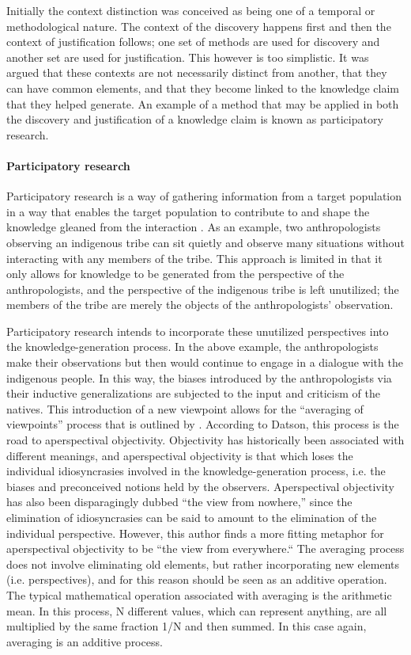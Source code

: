 \documentclass[a4paper]{article}
\begin{document}
Initially the context distinction was conceived as being one of a temporal or
methodological nature. The context of the discovery happens first and then the
context of justification follows; one set of methods are used for discovery
and another set are used for justification. This however is too simplistic.
It was argued that these contexts are not necessarily distinct from another,
that they can have common elements, and that they become linked to the
knowledge claim that they helped generate. An example of a method that may be
applied in both the discovery and justification of a knowledge claim is known
as participatory research.

\paragraph{Participatory research}
\label{part}

Participatory research is a way of gathering information from a target
population in a way that enables the target population to contribute to and
shape the knowledge gleaned from the interaction
\cite{bergold2012participatory}. As an example, two anthropologists observing
an indigenous tribe can sit quietly and observe many situations without
interacting with any members of the tribe. This approach is limited in that it
only allows for knowledge to be generated from the perspective of the
anthropologists, and the perspective of the indigenous tribe is left
unutilized; the members of the tribe are merely the objects of the
anthropologists' observation.

Participatory research intends to incorporate these unutilized perspectives
into the knowledge-generation process. In the above example, the
anthropologists make their observations but then would continue to engage in a
dialogue with the indigenous people. In this way, the biases introduced by the
anthropologists via their inductive generalizations are subjected to the input
and criticism of the natives. This introduction of a new viewpoint allows for
the ``averaging of viewpoints'' process that is outlined by
\cite{datson1992objectivity}. According to Datson, this process is the road to
aperspectival objectivity. Objectivity has historically been associated with
different meanings, and aperspectival objectivity is that which loses the
individual idiosyncrasies involved in the knowledge-generation process, i.e.
the biases and preconceived notions held by the observers. Aperspectival
objectivity has also been disparagingly dubbed ``the view from nowhere,''
since the elimination of idiosyncrasies can be said to amount to the
elimination of the individual perspective. However, this author finds a more
fitting metaphor for aperspectival objectivity to be ``the view from
everywhere.`` The averaging process does not involve eliminating old elements,
but rather incorporating new elements (i.e. perspectives), and for this
reason should be seen as an additive operation. The typical mathematical
operation associated with averaging is the arithmetic mean. In this process, N
different values, which can represent anything, are all multiplied by the same
fraction 1/N and then summed. In this case again, averaging is an additive
process.
\end{document}
